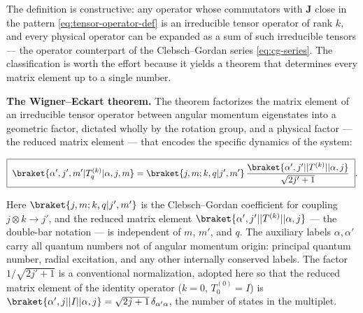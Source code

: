 The definition is constructive: any operator whose commutators with $\bm J$ close in the pattern \eqref{eq:tensor-operator-def} is an irreducible tensor operator of rank $k$, and every physical operator can be expanded as a sum of such irreducible tensors --- the operator counterpart of the Clebsch--Gordan series \eqref{eq:cg-series}. The classification is worth the effort because it yields a theorem that determines every matrix element up to a single number.

\medskip\noindent\textbf{The Wigner--Eckart theorem.} The theorem factorizes the matrix element of an irreducible tensor operator between angular momentum eigenstates into a geometric factor, dictated wholly by the rotation group, and a physical factor --- the reduced matrix element --- that encodes the specific dynamics of the system:
\begin{linenomath}
\begin{equation}
\boxed{\;
\braket{\alpha',j',m'|T^{(k)}_q|\alpha,j,m}
= \braket{j,m;k,q|j',m'}\,
\frac{\braket{\alpha',j'||T^{(k)}||\alpha,j}}{\sqrt{2j'+1}} \; } .
\label{eq:wigner-eckart}
\end{equation}
\end{linenomath}
Here $\braket{j,m;k,q|j',m'}$ is the Clebsch--Gordan coefficient for coupling $j \otimes k \to j'$, and the reduced matrix element $\braket{\alpha',j'||T^{(k)}||\alpha,j}$ --- the double-bar notation --- is independent of $m$, $m'$, and $q$. The auxiliary labels $\alpha,\alpha'$ carry all quantum numbers not of angular momentum origin: principal quantum number, radial excitation, and any other internally conserved labels. The factor $1/\sqrt{2j'+1}$ is a conventional normalization, adopted here so that the reduced matrix element of the identity operator ($k=0$, $T^{(0)}_0 = I$) is $\braket{\alpha',j||I||\alpha,j} = \sqrt{2j+1}\,\delta_{\alpha'\alpha}$, the number of states in the multiplet.

